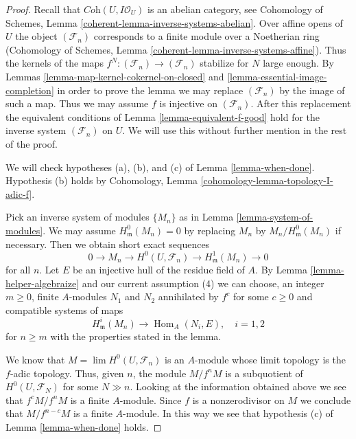 \documentclass{stacks-project}
\theoremstyle{plain}
\theoremstyle{definition}
\theoremstyle{remark}
\numberwithin{equation}{subsection}
\def\lim{\mathop{\mathrm{lim}}\nolimits}
\def\Hom{\mathop{\mathrm{Hom}}\nolimits}
\begin{document}
\begin{proof}
Recall that $\textit{Coh}(U, I\mathcal{O}_U)$ is an abelian category, see
Cohomology of Schemes, Lemma \ref{coherent-lemma-inverse-systems-abelian}.
Over affine opens of $U$ the object $(\mathcal{F}_n)$
corresponds to a finite module over a Noetherian ring
(Cohomology of Schemes, Lemma \ref{coherent-lemma-inverse-systems-affine}).
Thus the kernels of the maps $f^N : (\mathcal{F}_n) \to (\mathcal{F}_n)$
stabilize for $N$ large enough. By
Lemmas \ref{lemma-map-kernel-cokernel-on-closed} and
\ref{lemma-essential-image-completion}
in order to prove the lemma
we may replace $(\mathcal{F}_n)$ by the image of such a map.
Thus we may assume $f$ is injective on $(\mathcal{F}_n)$.
After this replacement the equivalent conditions of
Lemma \ref{lemma-equivalent-f-good} hold for the inverse system
$(\mathcal{F}_n)$ on $U$. We will use this without further mention
in the rest of the proof.

\medskip\noindent
We will check hypotheses (a), (b), and (c) of
Lemma \ref{lemma-when-done}. Hypothesis (b) holds by
Cohomology, Lemma \ref{cohomology-lemma-topology-I-adic-f}.

\medskip\noindent
Pick an inverse system of modules $\{M_n\}$ as in
Lemma \ref{lemma-system-of-modules}.
We may assume $H^0_\mathfrak m(M_n) = 0$ by replacing $M_n$ by
$M_n/H^0_\mathfrak m(M_n)$ if necessary. Then we obtain short exact
sequences
$$
0 \to M_n \to H^0(U, \mathcal{F}_n) \to H^1_\mathfrak m(M_n) \to 0
$$
for all $n$. Let $E$ be an injective hull of the residue field of $A$.
By Lemma \ref{lemma-helper-algebraize} and our current assumption (4)
we can choose, an integer $m \geq 0$, finite $A$-modules
$N_1$ and $N_2$ annihilated by $f^c$ for some $c \geq 0$ and
compatible systems of maps
$$
H^i_\mathfrak m(M_n) \to \Hom_A(N_i, E), \quad i = 1, 2
$$
for $n \geq m$
with the properties stated in the lemma.

\medskip\noindent
We know that $M = \lim H^0(U, \mathcal{F}_n)$ is an $A$-module whose
limit topology is the $f$-adic topology. Thus, given $n$, the module
$M/f^nM$ is a subquotient of $H^0(U, \mathcal{F}_N)$ for some $N \gg n$.
Looking at the information obtained above we see that
$f^cM/f^nM$ is a finite $A$-module. Since $f$ is a nonzerodivisor
on $M$ we conclude that $M/f^{n - c}M$ is a finite $A$-module.
In this way we see that hypothesis (c) of Lemma \ref{lemma-when-done} holds.


\end{proof}
\end{document}
